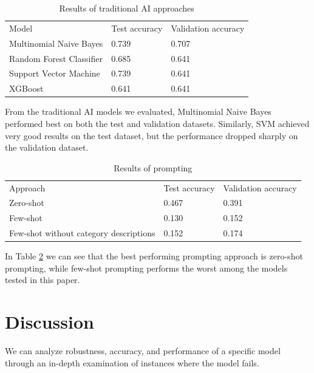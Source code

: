 \documentclass[fleqn,moreauthors,10pt]{ds_report}
\begin{document}
\begin{table}[h!]
\caption{Results of traditional AI approaches}
\begin{adjustbox}{width=\columnwidth,center}
\begin{tabular}{lll}
Model & Test accuracy & Validation accuracy \\
Multinomial Naive Bayes & 0.739 & 0.707 \\
Random Forest Classifier & 0.685 & 0.641 \\
Support Vector Machine & 0.739 & 0.641 \\
XGBoost & 0.641 & 0.641 
\end{tabular}
\label{tab:results_trad_AI}
\end{adjustbox}
\end{table}

From the traditional AI models we evaluated, Multinomial Naive Bayes performed best on both the test and validation datasets. Similarly, SVM achieved very good results on the test dataset, but the performance dropped sharply on the validation dataset. 

\begin{table}[h!]
\caption{Results of prompting}
\begin{adjustbox}{width=\columnwidth,center}
\begin{tabular}{lll}
Approach & Test accuracy & Validation accuracy \\
Zero-shot & 0.467 & 0.391 \\
Few-shot & 0.130 & 0.152 \\
Few-shot without category descriptions & 0.152 & 0.174 \\
\end{tabular}
\label{tab:results_prompt}
\end{adjustbox}
\end{table}

In Table \ref{tab:results_prompt} we can see that the best performing prompting approach is zero-shot prompting, while few-shot prompting performs the worst among the models tested in this paper.


\section*{Discussion}

We can analyze robustness, accuracy, and performance of a specific model through an in-depth examination of instances where the model fails. 
\end{document}
